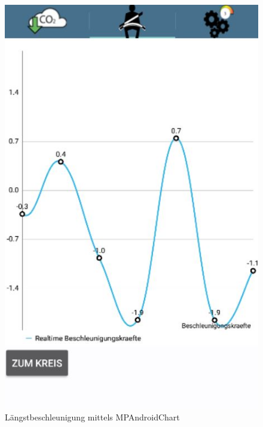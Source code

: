 

\begin{figure}[!tbp]
 	\centering
 	\begin{minipage}[b]{0.4\textwidth}
 		\includegraphics[width=\textwidth]{images/Liniendiagramm}
 		\caption{Längstbeschleunigung mittels MPAndroidChart}
 	\end{minipage}
 	\hfill
 	\begin{minipage}[b]{0.4\textwidth}

\end{minipage}
\end{figure}
